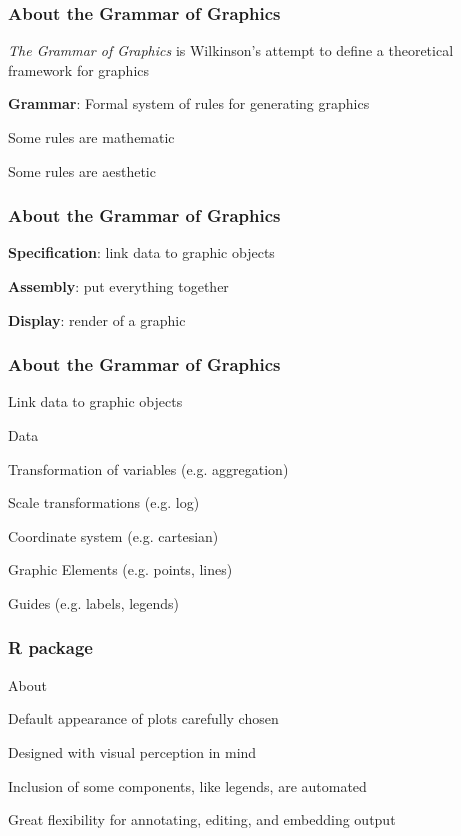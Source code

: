 \documentclass[12pt]{beamer}\usepackage[]{graphicx}\usepackage[]{color}
\begin{document}

\begin{frame}
\frametitle{About the Grammar of Graphics}

\bbi
  \item \textit{The Grammar of Graphics} is Wilkinson's attempt to define a theoretical framework for graphics
  \item \textbf{Grammar}: Formal system of rules for generating graphics
  \bi
    \item Some rules are mathematic
    \item Some rules are aesthetic
  \ei
\ei

\end{frame}


\begin{frame}
\frametitle{About the Grammar of Graphics}

\bbi
  \item \textbf{Specification}: link data to graphic objects
  \item \textbf{Assembly}: put everything together
  \item \textbf{Display}: render of a graphic
\ei
\eb

\end{frame}


\begin{frame}
\frametitle{About the Grammar of Graphics}

Link data to graphic objects
\bbi
  \item Data
  \item Transformation of variables (e.g. aggregation)
  \item Scale transformations (e.g. log)
  \item Coordinate system (e.g. cartesian)
  \item Graphic Elements (e.g. points, lines)
  \item Guides (e.g. labels, legends)
\ei
\eb

\end{frame}


\begin{frame}[fragile]
\frametitle{R package }

About 
\bbi
  \item Default appearance of plots carefully chosen
  \item Designed with visual perception in mind
  \item Inclusion of some components, like legends, are automated
  \item Great flexibility for annotating, editing, and embedding output
\ei

\end{frame}
\end{document}
